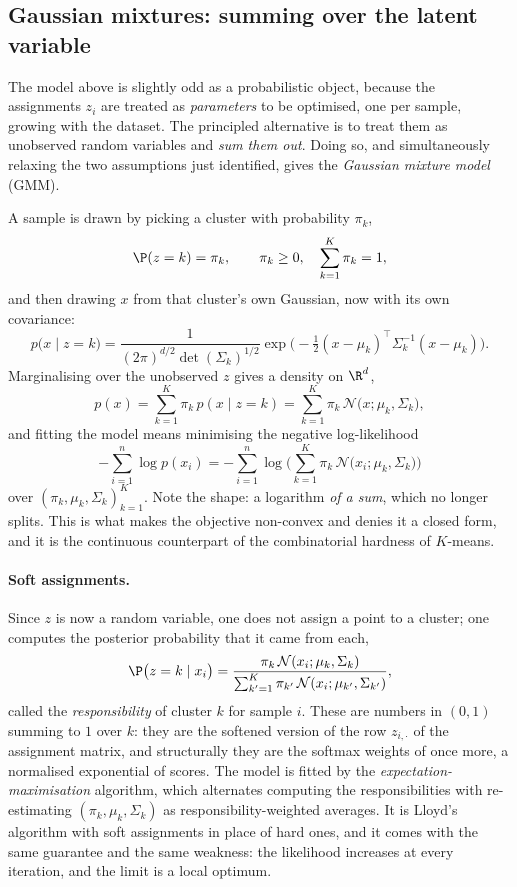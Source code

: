 \subsection{Gaussian mixtures: summing over the latent variable}
\label{subsec:gmm}

The model above is slightly odd as a probabilistic object, because the assignments
$z_i$ are treated as \emph{parameters} to be optimised, one per sample, growing with the
dataset. The principled alternative is to treat them as unobserved random variables and
\emph{sum them out}. Doing so, and simultaneously relaxing the two assumptions just
identified, gives the \emph{Gaussian mixture model} (GMM).

A sample is drawn by picking a cluster with probability $\pi_k$,
\[
\P(z = k) = \pi_k , \qquad \pi_k \geq 0 , \quad \sum_{k=1}^K \pi_k = 1 ,
\]
and then drawing $x$ from that cluster's own Gaussian, now with its own covariance:
\[
p\big( x \mid z = k \big) = \frac{1}{(2\pi)^{d/2} \det(\Sigma_k)^{1/2}}
\exp\Big( - \tfrac12 (x - \mu_k)^\top \Sigma_k^{-1} (x - \mu_k) \Big) .
\]
Marginalising over the unobserved $z$ gives a density on $\R^d$,
\[
p(x) = \sum_{k=1}^K \pi_k \, p(x \mid z = k) = \sum_{k=1}^K \pi_k \, \mathcal{N}\big( x ; \mu_k, \Sigma_k \big) ,
\]
and fitting the model means minimising the negative log-likelihood
\[
- \sum_{i=1}^n \log p(x_i)
= - \sum_{i=1}^n \log \Big( \sum_{k=1}^K \pi_k \, \mathcal{N}\big( x_i ; \mu_k, \Sigma_k \big) \Big)
\]
over $(\pi_k, \mu_k, \Sigma_k)_{k=1}^K$. Note the shape: a logarithm \emph{of a sum},
which no longer splits. This is what makes the objective non-convex and denies it a
closed form, and it is the continuous counterpart of the combinatorial hardness of
$K$-means.

\paragraph{Soft assignments.}
Since $z$ is now a random variable, one does not assign a point to a cluster; one
computes the posterior probability that it came from each,
\[
\P\big( z = k \mid x_i \big)
= \frac{\pi_k \, \mathcal{N}(x_i ; \mu_k, \Sigma_k)}{\sum_{k'=1}^K \pi_{k'} \, \mathcal{N}(x_i ; \mu_{k'}, \Sigma_{k'})} ,
\]
called the \emph{responsibility} of cluster $k$ for sample $i$. These are numbers in
$(0,1)$ summing to $1$ over $k$: they are the softened version of the row $z_{i,\cdot}$
of the assignment matrix, and structurally they are the softmax weights of
 once more, a normalised exponential of scores. The model is
fitted by the \emph{expectation-maximisation} algorithm, which alternates computing the
responsibilities with re-estimating $(\pi_k, \mu_k, \Sigma_k)$ as
responsibility-weighted averages. It is Lloyd's algorithm with soft assignments in
place of hard ones, and it comes with the same guarantee and the same weakness: the
likelihood increases at every iteration, and the limit is a local optimum.

